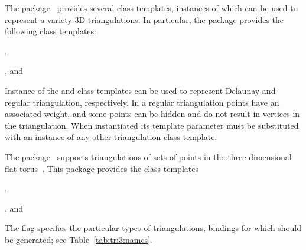 The \iiiDTriangulationsPackage{} package~\cite{cgal:pt-t3-21a}
provides several class templates, instances of which can be used to
represent a variety 3D triangulations. In particular, the package
provides the following class templates:
\begin{compactenum}
\item {},
\item {}, and
\item {}
\item {}
\end{compactenum}
Instance of the  and
 class templates can be used
to represent Delaunay and regular triangulation, respectively. In a
regular triangulation points have an associated weight, and some
points can be hidden and do not result in vertices in the
triangulation. When instantiated its template parameter must be
substituted with an instance of any other triangulation class
template.

The \iiiDPeriodicTriangulationsPackage{}
package~\cite{cgal:ct-pt3-21a} supports triangulations of sets of
points in the three-dimensional flat torus~\cite{ct-cpt-09}. This
package provides the class templates
\begin{compactenum}
\item {},
\item {}, and
\item {}
\item {}
\end{compactenum}

The \cmake{} flag  specifies the particular
types of triangulations, bindings for which should be generated; see
Table~\ref{tab:tri3:names}.

